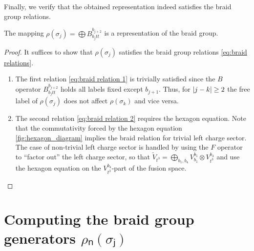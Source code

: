 Finally, we verify that the obtained representation indeed satisfies the braid group relations.
\begin{lemma}
  The mapping $ρ(σ_j) = \bigoplus B_{b_j t t}^{b_{j+2}}$ is a representation of the braid group.
\end{lemma}
\begin{proof}
  It suffices to show that $ρ(σ_j)$ satisfies the braid group relations \cref{eq:braid relations}.
  \begin{enumerate}
    \item The first relation \cref{eq:braid relation 1} is trivially satisfied since the $B$ operator $B_{b_jtt}^{b_{j+2}}$ holds all labels fixed except $b_{j+1}$. Thus, for $\lvert j-k\rvert \ge 2$ the free label of $ρ(σ_j)$ does not affect $ρ(σ_k)$ and vice versa.
    \item The second relation \cref{eq:braid relation 2} requires the hexagon equation. Note that the commutativity forced by the hexagon equation \cref{fig:hexagon_diagram} implies the braid relation for trivial left charge sector. The case of non-trivial left charge sector is handled by using the $F$ operator to ``factor out'' the left charge sector, so that $\widetilde{V}_{t^3} = \bigoplus_{b_1, b_4} V_{b_1}^{b_{1}} \otimes V_{t^3}^{b_{4}}$ and use the hexagon equation on the $V_{t^3}^{b_{4}}$-part of the fusion space.
  \end{enumerate}
\end{proof}

























\section{Computing the braid group generators \texorpdfstring{$ρₙ(σⱼ)$}{ρₙ(σⱼ)}}\label{sec:general braiding}

